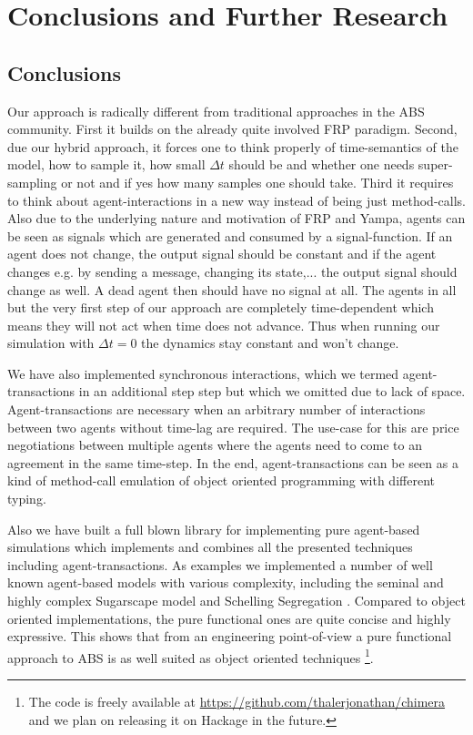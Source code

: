 \section{Conclusions and Further Research}
\subsection{Conclusions}
Our approach is radically different from traditional approaches in the ABS community. First it builds on the already quite involved FRP paradigm. Second, due our hybrid approach, it forces one to think properly of time-semantics of the model, how to sample it, how small $\Delta t$ should be and whether one needs super-sampling or not and if yes how many samples one should take. Third it requires to think about agent-interactions in a new way instead of being just method-calls. Also due to the underlying nature and motivation of FRP and Yampa, agents can be seen as signals which are generated and consumed by a signal-function.  If an agent does not change, the output signal should be constant and if the agent changes e.g. by sending a message, changing its state,... the output signal should change as well. A dead agent then should have no signal at all. The agents in all but the very first step of our approach are completely time-dependent which means they will not act when time does not advance. Thus when running our simulation with $\Delta t = 0$ the dynamics stay constant and won't change.

We have also implemented synchronous interactions, which we termed agent-transactions in an additional step step but which we omitted due to lack of space. Agent-transactions are necessary when an arbitrary number of interactions between two agents without time-lag are required. The use-case for this are price negotiations between multiple agents where the agents need to come to an agreement in the same time-step. In the end, agent-transactions can be seen as a kind of method-call emulation of object oriented programming with different typing.

Also we have built a full blown library for implementing pure agent-based simulations which implements and combines all the presented techniques including agent-transactions. As examples we implemented a number of well known agent-based models with various complexity, including the seminal and highly complex Sugarscape model \cite{epstein_growing_1996} and Schelling Segregation \cite{schelling_dynamic_1971}. Compared to object oriented implementations, the pure functional ones are quite concise and highly expressive. This shows that from an engineering point-of-view a pure functional approach to ABS is as well suited as object oriented techniques \footnote{The code is freely available at \url{https://github.com/thalerjonathan/chimera} and we plan on releasing it on Hackage in the future.}.

